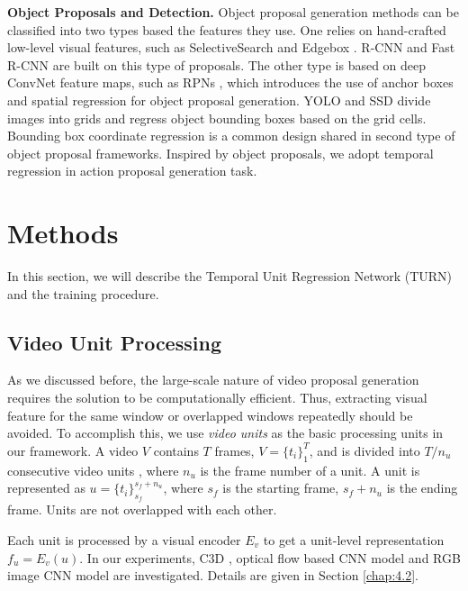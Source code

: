 \documentclass[10pt,twocolumn,letterpaper]{article}
\begin{document}
\textbf{Object Proposals and Detection.} 
Object proposal generation methods can be classified into two types based the features they use. One relies on hand-crafted low-level visual features, such as SelectiveSearch \cite{uijlings2013selective} and Edgebox \cite{zitnick2014edge}. R-CNN \cite{Girshick_2014_CVPR} and Fast R-CNN \cite{girshick2015fast} are built on this type of proposals. The other type is based on deep ConvNet feature maps, such as RPNs \cite{ren2015faster}, which introduces the use of anchor boxes and spatial regression for object proposal generation. YOLO \cite{Redmon_2016_CVPR} and SSD \cite{liu2015ssd} divide images into grids and regress object bounding boxes based on the grid cells. Bounding box coordinate regression is a common design shared in second type of object proposal frameworks. Inspired by object proposals, we adopt temporal regression in action proposal generation task.
 






\section{Methods}


In this section, we will describe the Temporal Unit Regression Network (TURN) and the training procedure.  

\subsection{Video Unit Processing} \label{sec:unit processing}
As we discussed before, the large-scale nature of video proposal generation requires the solution to be computationally efficient. Thus, extracting visual feature for the same window or overlapped windows repeatedly should be avoided. To accomplish this, we use \emph{video units} as the basic processing units in our framework. A video $V$ contains $T$ frames, $V=\{t_i\}_1^T$, and is divided into $T/n_u$ consecutive video units , where $n_u$ is the frame number of a unit. A unit is represented as $u=\{t_i\}_{s_f}^{s_f+n_u}$, where $s_f$ is the starting frame, $s_f+n_u$ is the ending frame. Units are not overlapped with each other.  

Each unit is processed by a visual encoder $E_v$ to get a unit-level representation $f_u=E_v(u)$. In our experiments, C3D \cite{tran2015learning}, optical flow based CNN model and RGB image CNN model \cite{simonyan2014two} are investigated. Details are given in Section \ref{chap:4.2}.
\end{document}
